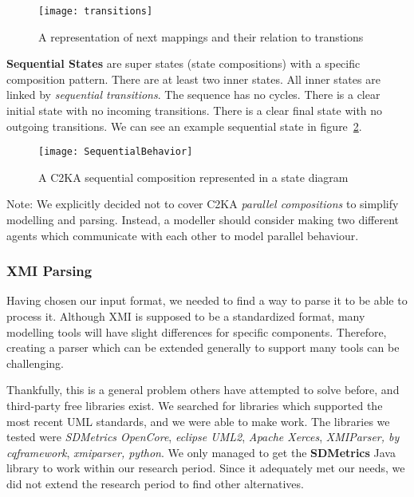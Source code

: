\begin{figure}[ht]
    \centering
    \texttt{[image: transitions]}
    \caption{A representation of next mappings and their relation to transtions}
    \label{fig:transition}
\end{figure}

\textbf{Sequential States} are super states (state compositions) with a specific composition pattern.
There are at least two inner states.
All inner states are linked by \textit{sequential transitions}.
The sequence has no cycles.
There is a clear initial state with no incoming transitions.
There is a clear final state with no outgoing transitions.
We can see an example sequential state in figure~\ref{fig:sequential}.

\begin{figure}[ht]
    \centering
    \texttt{[image: SequentialBehavior]}
    \caption{A C2KA sequential composition represented in a state diagram}
    \label{fig:sequential}
\end{figure}

Note: We explicitly decided not to cover C2KA \textit{parallel compositions} to simplify modelling and parsing.
Instead, a modeller should consider making two different agents which communicate
with each other to model parallel behaviour.

\subsubsection{XMI Parsing}\label{subsubsec:parsing}
Having chosen our input format, we needed to find a way to parse it to be able to process it.
Although XMI is supposed to be a standardized format,
many modelling tools will have slight differences for specific components.
Therefore, creating a parser which can be extended generally to support many tools can be challenging.

Thankfully, this is a general problem others have attempted to solve before, and third-party free libraries exist.
We searched for libraries which supported the most recent UML standards, and we were able to make work.
The libraries we tested were \textit{SDMetrics OpenCore},
\textit{eclipse UML2}, \textit{Apache Xerces}, \textit{XMIParser, by cqframework}, \textit{xmiparser, python}.
We only managed to get the \textbf{SDMetrics} Java library to work within our research period.
Since it adequately met our needs, we did not extend the research period to find other alternatives.

